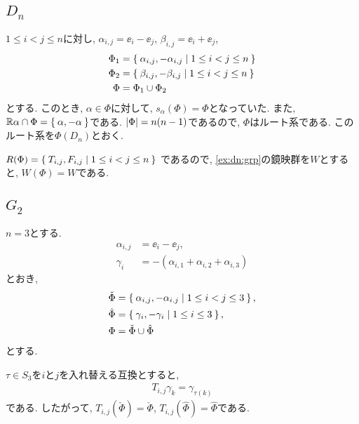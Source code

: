 \subsection{$D_{n}$}
\label{ex:dn:root}
$1\leq i<j\leq n$に対し,
$\alpha_{i,j}=\ee_i-\ee_j$,
$\beta_{i,j}=\ee_i+\ee_j$,
\begin{align*}
  \Phi_1&=\Set{\alpha_{i,j},-\alpha_{i,j}|1\leq i<j\leq n}\\
  \Phi_2&=\Set{\beta_{i,j},-\beta_{i,j}|1\leq i<j\leq n}\\
  \Phi&=\Phi_1\cup \Phi_2
\end{align*}
とする.
このとき,
$\alpha\in \Phi$に対して,
$s_\alpha(\Phi)=\Phi$となっていた.
また,
$\mathbb{R}\alpha\cap\Phi=\Set{\alpha,-\alpha}$である.
$\left|\Phi\right|=n(n-1)$であるので,
$\Phi$はルート系である.
このルート系を$\Phi(D_{n})$とおく.

$R(\Phi)=\Set{T_{i,j},F_{i,j}|1\leq i< j\leq n}$
であるので,
\cref{ex:dn:grp}の鏡映群を$W$とすると,
$W(\Phi)=W$である.

\subsection{$G_2$}
\label{ex:g2:root}
$n=3$とする.
\begin{align*}
  \alpha_{i,j}&=\ee_i-\ee_j,\\
  \gamma_{i}&=-(\alpha_{i,1}+\alpha_{i,2}+\alpha_{i,3})
\end{align*}
とおき,
\begin{align*}
  \check\Phi&=\Set{\alpha_{i,j},-\alpha_{i.j}|1\leq i<j\leq 3},\\
  \hat\Phi&=\Set{\gamma_{i},-\gamma_{i}|1\leq i\leq 3},\\
  \Phi&=\check\Phi\cup\hat\Phi
\end{align*}
とする.

$\tau\in S_3$を$i$と$j$を入れ替える互換とすると,
\begin{align*}
  T_{i,j}\gamma_k=\gamma_{\tau(k)}
\end{align*}
である. したがって,
$T_{i,j}(\check\Phi)=\check\Phi$,
$T_{i,j}(\hat\Phi)=\hat\Phi$である.

